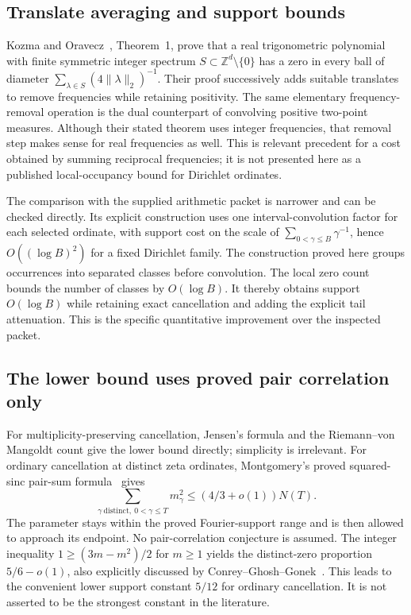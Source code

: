 \subsection{Translate averaging and support bounds}

Kozma and Oravecz~\cite{KozmaOravecz}, Theorem~1, prove that a real
trigonometric polynomial with finite symmetric integer spectrum
$S\subset\mathbb Z^d\setminus\{0\}$ has a zero in every ball of
diameter $\sum_{\lambda\in S}(4\|\lambda\|_2)^{-1}$.
Their proof successively adds suitable translates to remove
frequencies while retaining positivity. The same elementary
frequency-removal operation is the dual counterpart of convolving
positive two-point measures. Although their stated theorem uses
integer frequencies, that removal step makes sense for real
frequencies as well. This is relevant precedent for a cost obtained
by summing reciprocal frequencies; it is not presented here as a
published local-occupancy bound for Dirichlet ordinates.

The comparison with the supplied arithmetic packet is narrower and
can be checked directly. Its explicit construction uses one
interval-convolution factor for each selected ordinate, with support
cost on the scale of $\sum_{0<\gamma\le B}\gamma^{-1}$, hence
$O((\log B)^2)$ for a fixed Dirichlet family. The construction proved
here groups occurrences into separated classes before convolution.
The local zero count bounds the number of classes by $O(\log B)$.
It thereby obtains support $O(\log B)$ while retaining exact
cancellation and adding the explicit tail attenuation. This is the
specific quantitative improvement over the inspected packet.

\subsection{The lower bound uses proved pair correlation only}

For multiplicity-preserving cancellation, Jensen's formula and the
Riemann--von Mangoldt count give the lower bound directly; simplicity
is irrelevant. For ordinary cancellation at distinct zeta ordinates,
Montgomery's proved squared-sinc pair-sum formula~\cite{Montgomery}
gives
\[
 \sum_{\gamma\ \mathrm{distinct},\ 0<\gamma\le T}m_\gamma^2
 \le (4/3+o(1))N(T).
\]
The parameter stays within the proved Fourier-support range and is
then allowed to approach its endpoint. No pair-correlation
conjecture is assumed. The integer inequality
$1\ge(3m-m^2)/2$ for $m\ge1$ yields the distinct-zero proportion
$5/6-o(1)$, also explicitly discussed by
Conrey--Ghosh--Gonek~\cite[pp.~497--498]{CGG}. This leads to the
convenient lower support constant $5/12$ for ordinary cancellation.
It is not asserted to be the strongest constant in the literature.

